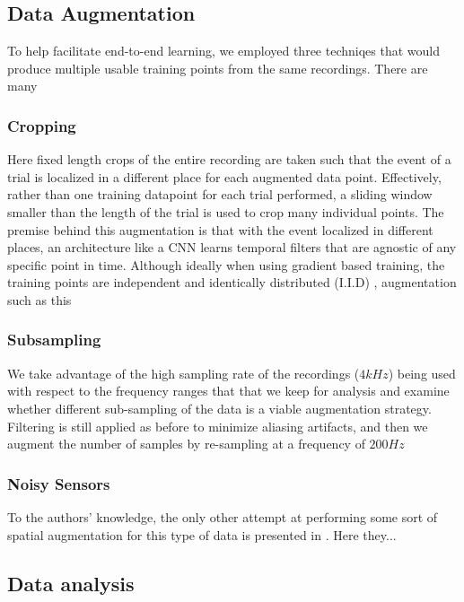 \documentclass[utf8]{frontiersSCNS} %
\begin{document}
\subsection{Data Augmentation}

To help facilitate end-to-end learning, we employed three techniqes that would produce multiple usable training points from the same recordings. There are many 

\subsubsection{Cropping}

Here fixed length crops of the entire recording are taken such that the event of a trial is localized in a different place for each augmented data point. Effectively, rather than one training datapoint for each trial performed, a sliding window smaller than the length of the trial is used to crop many individual points. The premise behind this augmentation is that with the event localized in different places, an architecture like a CNN learns temporal filters that are agnostic of any specific point in time. Although ideally when using gradient based training, the training points are independent and identically distributed (I.I.D) \cite{}, augmentation such as this 

\subsubsection{Subsampling}

We take advantage of the high sampling rate of the recordings ($4kHz$) being used with respect to the frequency ranges that that we keep  for analysis and examine whether different sub-sampling of the data is a viable augmentation strategy. Filtering is still applied as before to minimize aliasing artifacts, and then we augment the number of samples by re-sampling at a frequency of $200 Hz$

\subsubsection{Noisy Sensors}

To the authors' knowledge, the only other attempt at performing some sort of spatial augmentation for this type of data is presented in \cite{}. Here they...


\subsection{Data analysis}
\end{document}
